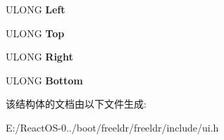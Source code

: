 \begin{DoxyCompactItemize}
U\+L\+O\+NG {\bfseries Left}
\item 
\mbox{\label{structtag_u_i___m_e_n_u___i_n_f_o_ae884a3b729af8c7393a361f1a1839af3}} 
U\+L\+O\+NG {\bfseries Top}
\item 
\mbox{\label{structtag_u_i___m_e_n_u___i_n_f_o_a4a762f0a9fe885fc9ac7cf8818cf9c84}} 
U\+L\+O\+NG {\bfseries Right}
\item 
\mbox{\label{structtag_u_i___m_e_n_u___i_n_f_o_a953b13930a40961a5fcf2a33e4bb4b42}} 
U\+L\+O\+NG {\bfseries Bottom}
\end{DoxyCompactItemize}


该结构体的文档由以下文件生成\+:\begin{DoxyCompactItemize}
\item 
E\+:/\+React\+O\+S-\/0../boot/freeldr/freeldr/include/ui.\+h\end{DoxyCompactItemize}
